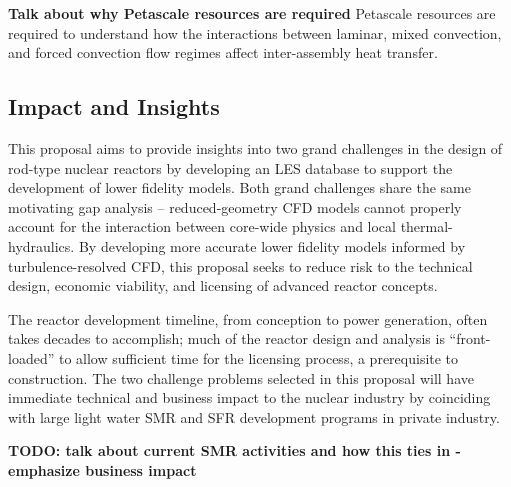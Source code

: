 {\bf Talk about why Petascale resources are required}
Petascale resources are required to understand how the interactions between
laminar, mixed convection, and forced convection flow regimes affect
inter-assembly heat transfer.




\vspace{-.25in}
\subsection{Impact and Insights}
\vspace{-.2in}

This proposal aims to provide insights into two grand challenges in the design
of rod-type nuclear reactors by developing an LES database to support the
development of lower fidelity models. Both grand challenges share the same
motivating gap analysis -- reduced-geometry CFD models cannot properly account
for the interaction between core-wide physics and local thermal-hydraulics. By
developing more accurate lower fidelity models informed by turbulence-resolved
CFD, this proposal seeks to reduce risk to the technical design, economic
viability, and licensing of advanced reactor concepts. 

The reactor development timeline, from conception to power generation, often
takes decades to accomplish; much of the reactor design and analysis is
``front-loaded'' to allow sufficient time for the licensing process, a
prerequisite to construction. The two challenge problems selected in this
proposal will have immediate technical and business impact to the nuclear
industry by coinciding with large light water SMR and SFR development programs
in private industry.

{\bf TODO: talk about current SMR activities and how this ties in - emphasize
business impact}

